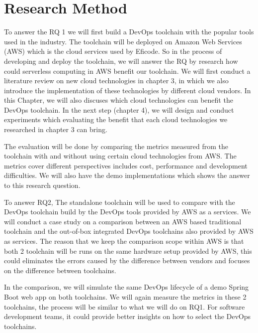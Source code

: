 \section{Research Method}
To answer the RQ 1 we will first build a DevOps toolchain with the popular tools used in the industry. The toolchain will be deployed on Amazon Web Services (AWS) which is the cloud services used by Eficode. 
So in the process of developing and deploy the toolchain, we will answer the RQ by research how could serverless computing in AWS benefit our toolchain. We will first conduct a literature review on new cloud technologies in chapter 3, in which we also introduce the implementation of these technologies by different cloud vendors. In this Chapter, we will also discuses which cloud technologies can benefit the DevOps toolchain. In the next step (chapter 4), we will design and conduct experiments which evaluating the benefit that each cloud technologies we researched in chapter 3 can bring. 
\par
The evaluation will be done by comparing the metrics measured from the toolchain with and without using certain cloud technologies from AWS. The metrics cover different perspectives includes cost, performance and development difficulties. We will also have the demo implementations which shows the answer to this research question.
\par
To answer RQ2, The standalone toolchain will be used to compare with the DevOps toolchain build by the DevOps tools provided by AWS as a services. We will conduct a case study on a comparison between an AWS based traditional toolchain and the out-of-box integrated DevOps toolchains also provided by AWS as services. The reason that we keep the comparison scope within AWS is that both 2 toolchain will be runs on the same hardware setup provided by AWS, this could eliminates the errors caused by the difference between vendors and focuses on the difference between toolchains.
\par
In the comparison, we will simulate the same DevOps lifecycle of a demo Spring Boot web app on both toolchains. We will again measure the metrics in these 2 toolchains, the process will be similar to what we will do on RQ1.
For software development teams, it could provide better insights on how to select the DevOps toolchains.
